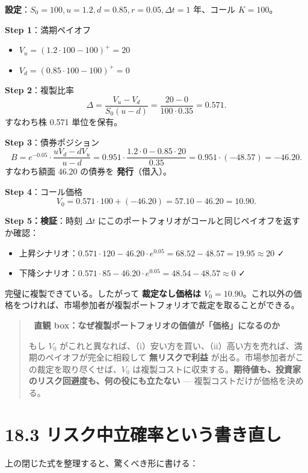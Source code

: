 \documentclass[11pt,a4paper]{report}
\begin{document}
\textbf{設定}：$S_0 = 100, u = 1.2, d = 0.85, r = 0.05, \Delta t = 1$ 年、コール $K = 100$。

\textbf{Step 1}：満期ペイオフ
\begin{itemize}
\item $V_u = (1.2 \cdot 100 - 100)^+ = 20$
\item $V_d = (0.85 \cdot 100 - 100)^+ = 0$
\end{itemize}

\textbf{Step 2}：複製比率 \[ \Delta = \frac{V_u - V_d}{S_0(u - d)} = \frac{20 - 0}{100 \cdot 0.35} = 0.571. \] すなわち株 0.571 単位を保有。

\textbf{Step 3}：債券ポジション \[ B = e^{-0.05} \cdot \frac{u V_d - d V_u}{u - d} = 0.951 \cdot \frac{1.2 \cdot 0 - 0.85 \cdot 20}{0.35} = 0.951 \cdot (-48.57) = -46.20. \] すなわち額面 46.20 の債券を \textbf{発行}（借入）。

\textbf{Step 4}：コール価格 \[ V_0 = 0.571 \cdot 100 + (-46.20) = 57.10 - 46.20 = 10.90. \]

\textbf{Step 5：検証}：時刻 $\Delta t$ にこのポートフォリオがコールと同じペイオフを返すか確認：
\begin{itemize}
\item 上昇シナリオ：$0.571 \cdot 120 - 46.20 \cdot e^{0.05} = 68.52 - 48.57 = 19.95 \approx 20$ ✓
\item 下降シナリオ：$0.571 \cdot 85 - 46.20 \cdot e^{0.05} = 48.54 - 48.57 \approx 0$ ✓
\end{itemize}

完璧に複製できている。したがって \textbf{裁定なし価格は $V_0 = 10.90$}。これ以外の価格をつければ、市場参加者が複製ポートフォリオで裁定を取ることができる。

\begin{quote}
🎯 \textbf{直観 box：なぜ複製ポートフォリオの価値が「価格」になるのか}

もし $V_0$ がこれと異なれば、（i）安い方を買い、（ii）高い方を売れば、満期のペイオフが完全に相殺して \textbf{無リスクで利益} が出る。市場参加者がこの裁定を取り尽くせば、$V_0$ は複製コストに収束する。\textbf{期待値も、投資家のリスク回避度も、何の役にも立たない} — 複製コストだけが価格を決める。
\end{quote}

\section{18.3 リスク中立確率という書き直し}

上の閉じた式を整理すると、驚くべき形に書ける：
\end{document}
